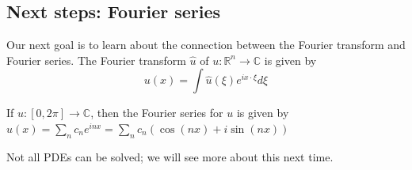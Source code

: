 \subsection{Next steps: Fourier series}
Our next goal is to learn about the connection between the Fourier transform and Fourier series. The Fourier transform $\widehat{u}$ of $u: \mathbb{R}^{n} \rightarrow \mathbb{C}$ is given by
$$
u(x)=\int \widehat{u}(\xi) e^{i x \cdot \xi} d \xi
$$

\begin{definition}
    If $u:[0,2 \pi] \rightarrow \mathbb{C}$, then the Fourier series for $u$ is given by $u(x)=\sum_{n} c_{n} e^{i n x}=\sum_{n} c_{n}(\cos (n x)+i \sin (n x))$
\end{definition}
Not all PDEs can be solved; we will see more about this next time.